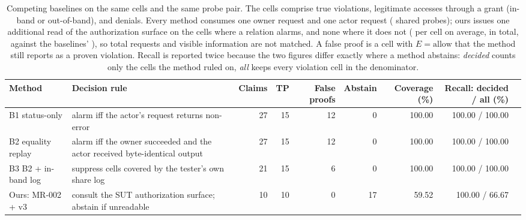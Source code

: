 \begin{table}[t]
\centering
\caption{Competing baselines on the same \BlCells{} cells and the same probe pair. The cells comprise \BlBolaCells{} true violations, \BlLegitCells{} legitimate accesses through a grant (in-band or out-of-band), and \BlDeniedCells{} denials. Every method consumes one owner request and one actor request (\BlSharedProbes{} shared probes); ours issues one additional read of the authorization surface on the \BlOursExtraCells{} cells where a relation alarms, and none where it does not (\BlOursExtraAvg{} per cell on average, \BlOursExtraTotal{} in total, \BlOursRequestsTotal{} against the baselines' \BlSharedProbes{}), so total requests and visible information are not matched. A false proof is a cell with $E=\text{allow}$ that the method still reports as a proven violation. Recall is reported twice because the two figures differ exactly where a method abstains: \emph{decided} counts only the cells the method ruled on, \emph{all} keeps every violation cell in the denominator.}
\label{tab:baselines}
\footnotesize
\setlength{\tabcolsep}{4pt}
\begin{tabular}{@{}p{}p{}rrrrrrr@{}}
\toprule
Method & Decision rule & Claims & TP & False proofs & Abstain & Coverage (\%) & Recall: decided / all (\%) \\
\midrule
B1 status-only & alarm iff the actor's request returns non-error & 27 & 15 & 12 & 0 & 100.00 & 100.00 / 100.00 \\
B2 equality replay & alarm iff the owner succeeded and the actor received byte-identical output & 27 & 15 & 12 & 0 & 100.00 & 100.00 / 100.00 \\
B3 B2 + in-band log & suppress cells covered by the tester's own share log & 21 & 15 & 6 & 0 & 100.00 & 100.00 / 100.00 \\
Ours: MR-002 + v3 & consult the SUT authorization surface; abstain if unreadable & 10 & 10 & 0 & 17 & 59.52 & 100.00 / 66.67 \\
\bottomrule
\end{tabular}
\end{table}
